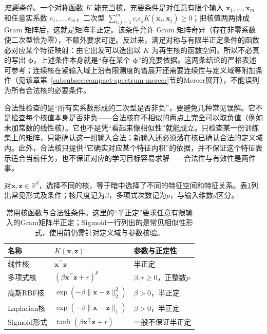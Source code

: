 \emph{充要条件。}一个对称函数 $K$ 能充当核，充要条件是对任意有限个输入 $\bm x_1,\ldots,\bm x_m$ 和任意实系数 $c_1,\ldots,c_m$，二次型 $\sum_{i,j=1}^m c_ic_jK(\bm x_i,\bm x_j)\ge0$；把核值两两排成 Gram 矩阵后，这就是矩阵半正定。该条件允许 Gram 矩阵奇异（存在非零系数使二次型恰为零），不额外要求可逆。反过来，满足对称与有限半正定条件的函数必对应某个特征映射：由它出发可以造出以 $K$ 为再生核的函数空间，所以不必真的写出 $\bm\phi$，上述条件本身就是“存在某个 $\bm\phi$”的充要依据。这两条结论的严格表述可参考；连续核在紧输入域上沿有限测度的谱展开还需要连续性与定义域等附加条件（见该章第~\ref{subsubsec:compact-spectrum-mercer}节的Mercer展开），不能误列为所有合法核的必要条件。

合法性检查的是“所有实系数形成的二次型是否非负”，要避免几种常见误解。它不是检查每个核值本身是否非负——合法核在不相似的两点上完全可以取负值（例如未加常数的线性核）。它也不是凭“看起来像相似性”就能成立。只检查某一份训练集上的矩阵，只能确认这一组输入合法；新输入还必须落在核已确认合法的定义域内。此外，合法核只提供“它确实对应某个特征内积”的依据，并不保证这个特征表示适合当前任务，也不保证对应的学习目标容易求解——合法性与有效性是两件事。

对$\bm x,\bm z\in\mathbb R^d$，选择不同的核，等于暗中选择了不同的特征空间和特征关系。表\ref{tab:classic-overview-common-kernels}列出常见形式及条件；核尺度记为$\beta$，多项式次数记为$p$，与输入维数$d$区分。

\begin{table}[htbp]
  \centering
  \small
  \begin{tabularx}{\linewidth}{@{}>{\RaggedRight\arraybackslash}p{18mm}>{\RaggedRight\arraybackslash}X>{\RaggedRight\arraybackslash}p{27mm}@{}}
    \toprule
    名称 & $K(\bm{x},\bm{z})$ & 参数与正定性\\
    \midrule
    线性核 & $\bm{x}^{\top}\bm{z}$ & 半正定\\
    多项式核 & $(\beta\bm{x}^{\top}\bm{z}+r)^p$ & $\beta,r\ge0$，正整数$p$\\
    高斯RBF核 & $\exp(-\beta\lVert\bm{x}-\bm{z}\rVert_2^2)$ & $\beta>0$，半正定\\
    Laplacian核 & $\exp(-\beta\lVert\bm{x}-\bm{z}\rVert_1)$ & $\beta>0$，半正定\\
    Sigmoid形式 & $\tanh(\beta\bm{x}^{\top}\bm{z}+r)$ & 一般不保证半正定\\
    \bottomrule
  \end{tabularx}
  \caption{常用核函数与合法性条件。这里的“半正定”要求任意有限输入的Gram矩阵半正定；Sigmoid一行列出的是常见相似性形式，使用前仍需针对定义域与参数核验。}
  \label{tab:classic-overview-common-kernels}
\end{table}

